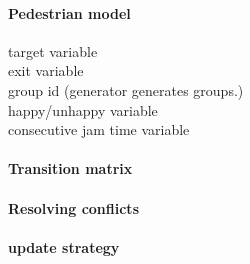\documentclass[paper=a4, fontsize=11pt]{article} %
\begin{document}
\paragraph{Pedestrian model}
target variable \\
exit variable \\
group id (generator generates groups.) \\
happy/unhappy variable \\
consecutive jam time variable \\

\paragraph{Transition matrix}

\paragraph{Resolving conflicts}

\paragraph{update strategy}


\end{document}
